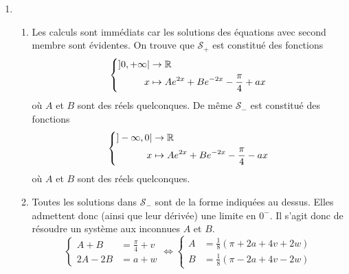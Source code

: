 \begin{enumerate}
 \item 
\begin{enumerate}
 \item Les calculs sont immédiats car les solutions des équations avec second membre sont évidentes. On trouve que $\mathcal{S}_+$ est constitué des fonctions
\begin{displaymath}
\left\lbrace  
\begin{aligned}
 ]0,+\infty| &\rightarrow \mathbb{R} \\
 x &\mapsto Ae^{2x} + Be^{-2x} -\frac{\pi}{4} + ax
\end{aligned}
\right. 
\end{displaymath}
où $A$ et $B$ sont des réels quelconques.\newline
De même $\mathcal{S}_-$ est constitué des fonctions
\begin{displaymath}
\left\lbrace  
\begin{aligned}
 ]-\infty,0| &\rightarrow \mathbb{R} \\
 x &\mapsto Ae^{2x} + Be^{-2x} -\frac{\pi}{4} - ax
\end{aligned}
\right. 
\end{displaymath}
où $A$ et $B$ sont des réels quelconques.
 \item Toutes les solutions dans $\mathcal{S}_-$ sont de la forme indiquées au dessus. Elles admettent donc (ainsi que leur dérivée) une limite en $0^-$. Il s'agit donc de résoudre un système aux inconnues $A$ et $B$.
\begin{displaymath}
 \left\lbrace 
\begin{aligned}
 A + B &= \frac{\pi}{4}+v\\ 2A -2B &= a +w
\end{aligned}
\right. 
\Leftrightarrow
\left\lbrace 
\begin{aligned}
 A &= \frac{1}{8}\left( \pi +2a+4v+2w\right)\\ 
 B &= \frac{1}{8}\left( \pi -2a+4v-2w\right)
\end{aligned}
\right. 
\end{displaymath}


\end{enumerate}
\end{enumerate}
